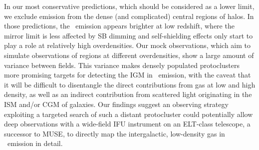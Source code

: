 In our most conservative predictions, which should be considered as a lower limit, we exclude emission from the dense (and complicated) central regions of halos. In those predictions, the \lya\ emission appears brighter at low redshift, where the mirror limit is less affected by SB dimming and self-shielding effects only start to play a role at relatively high overdensities. Our mock observations, which aim to simulate observations of regions at different overdensities, show a large amount of variance between fields. This variance makes densely populated protoclusters more promising targets for detecting the IGM in \lya\ emission, with the caveat that it will be difficult to disentangle the direct contributions from gas at low and high density, as well as an indirect contribution from scattered light originating in the ISM and/or CGM of galaxies. Our findings suggest an observing strategy exploiting a targeted search of such a distant protocluster could potentially allow deep observations with a wide-field IFU instrument on an ELT-class telescope, a successor to MUSE, to directly map the intergalactic, low-density gas in \lya\ emission in detail.